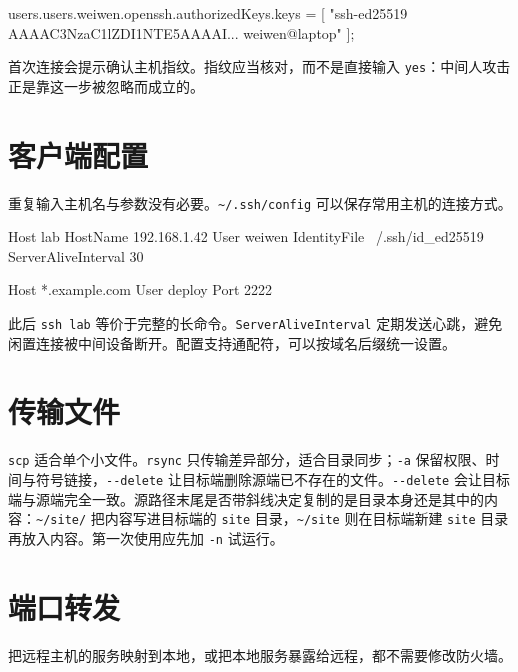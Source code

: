 \begin{nixcode}
users.users.weiwen.openssh.authorizedKeys.keys = [
  "ssh-ed25519 AAAAC3NzaC1lZDI1NTE5AAAAI... weiwen@laptop"
];
\end{nixcode}

首次连接会提示确认主机指纹。指纹应当核对，而不是直接输入 \texttt{yes}：中间人攻击正是靠这一步被忽略而成立的。

\section{客户端配置}

重复输入主机名与参数没有必要。\texttt{\textasciitilde/.ssh/config} 可以保存常用主机的连接方式。

\begin{textcode}
Host lab
  HostName 192.168.1.42
  User weiwen
  IdentityFile ~/.ssh/id_ed25519
  ServerAliveInterval 30

Host *.example.com
  User deploy
  Port 2222
\end{textcode}

此后 \texttt{ssh lab} 等价于完整的长命令。\texttt{Server\allowbreak{}Alive\allowbreak{}Interval} 定期发送心跳，避免闲置连接被中间设备断开。配置支持通配符，可以按域名后缀统一设置。

\section{传输文件}


\texttt{scp} 适合单个小文件。\texttt{rsync} 只传输差异部分，适合目录同步；\texttt{-a} 保留权限、时间与符号链接，\texttt{-{}-delete} 让目标端删除源端已不存在的文件。\texttt{-{}-delete} 会让目标端与源端完全一致。源路径末尾是否带斜线决定复制的是目录本身还是其中的内容：\texttt{\textasciitilde{}/site/} 把内容写进目标端的 \texttt{site} 目录，\texttt{\textasciitilde{}/site} 则在目标端新建 \texttt{site} 目录再放入内容。第一次使用应先加 \texttt{-n} 试运行。

\section{端口转发}

把远程主机的服务映射到本地，或把本地服务暴露给远程，都不需要修改防火墙。


